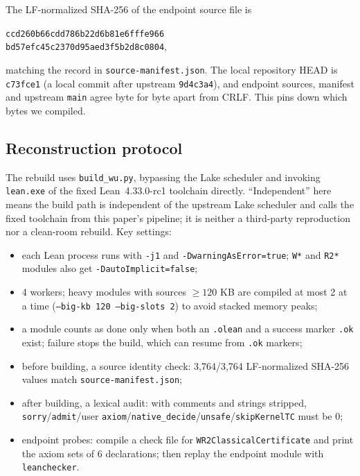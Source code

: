 \documentclass[11pt,a4paper]{article}
\theoremstyle{plain}
\theoremstyle{definition}
\begin{document}
The LF-normalized SHA-256 of the endpoint source file is
\begin{center}
\texttt{ccd260b66cdd786b22d6b81e6fffe966\\bd57efc45c2370d95aed3f5b2d8c0804},
\end{center}
matching the record in \texttt{source-manifest.json}. The local repository HEAD is \texttt{c73fce1} (a local commit after upstream \texttt{9d4c3a4}), and endpoint sources, manifest and upstream \texttt{main} agree byte for byte apart from CRLF. This pins down which bytes we compiled.

\subsection{Reconstruction protocol}
\label{sec:wu-protocol}

The rebuild uses \texttt{build\_wu.py}, bypassing the Lake scheduler and invoking \texttt{lean.exe} of the fixed Lean~4.33.0-rc1 toolchain directly. ``Independent'' here means the build path is independent of the upstream Lake scheduler and calls the fixed toolchain from this paper's pipeline; it is neither a third-party reproduction nor a clean-room rebuild. Key settings:

\begin{itemize}
\item each Lean process runs with \texttt{-j1} and \texttt{-DwarningAsError=true}; \texttt{W*} and \texttt{R2*} modules also get \texttt{-DautoImplicit=false};
\item 4 workers; heavy modules with sources $\ge120$ KB are compiled at most 2 at a time (\texttt{--big-kb 120 --big-slots 2}) to avoid stacked memory peaks;
\item a module counts as done only when both an \texttt{.olean} and a success marker \texttt{.ok} exist; failure stops the build, which can resume from \texttt{.ok} markers;
\item before building, a source identity check: 3,764/3,764 LF-normalized SHA-256 values match \texttt{source-manifest.json};
\item after building, a lexical audit: with comments and strings stripped, \texttt{sorry}/\texttt{admit}/user \texttt{axiom}/\texttt{native\_decide}/\texttt{unsafe}/\texttt{skipKernelTC} must be 0;
\item endpoint probes: compile a check file for \texttt{WR2ClassicalCertificate} and print the axiom sets of 6 declarations; then replay the endpoint module with \texttt{leanchecker}.
\end{itemize}
\end{document}
